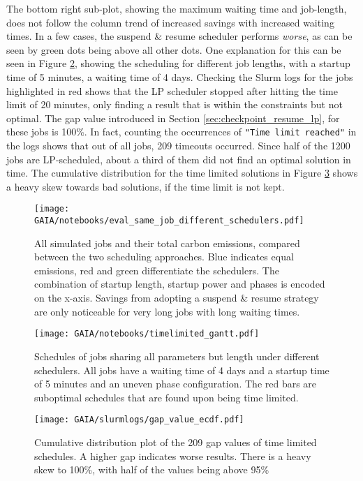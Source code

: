 The bottom right sub-plot, showing the maximum waiting time and job-length, does not follow the column trend of increased savings with increased waiting times. In a few cases, the suspend \& resume scheduler performs \emph{worse}, as can be seen by green dots being above all other dots.
One explanation for this can be seen in Figure \ref{fig:timelimited_gantt}, showing the scheduling for different job lengths, with a startup time of 5 minutes, a waiting time of 4 days.
Checking the Slurm logs for the jobs highlighted in red shows that the LP scheduler stopped after hitting the time limit of 20 minutes, only finding a result that is within the constraints but not optimal.
The gap value introduced in Section \ref{sec:checkpoint_resume_lp}, for these jobs is 100\%.
In fact, counting the occurrences of \verb|"Time limit reached"| in the logs shows that out of all jobs, 209 timeouts occurred. 
Since half of the 1200 jobs are LP-scheduled, about a third of them did not find an optimal solution in time.
The cumulative distribution for the time limited solutions in Figure \ref{fig:ecdf_gap} shows a heavy skew towards bad solutions, if the time limit is not kept.

\begin{figure}
    \texttt{[image: GAIA/notebooks/eval\_same\_job\_different\_schedulers.pdf]}
    \caption[short]{All simulated jobs and their total carbon emissions, compared between the two scheduling approaches. Blue indicates equal emissions, red and green differentiate the schedulers. The combination of startup length, startup power and phases is encoded on the x-axis. Savings from adopting a suspend \& resume strategy are only noticeable for very long jobs with long waiting times.}
    \label{fig:eval_different_schedulers}
\end{figure}

\begin{figure}
    \texttt{[image: GAIA/notebooks/timelimited\_gantt.pdf]}
    \caption[short]{Schedules of jobs sharing all parameters but length under different schedulers. All jobs have a waiting time of 4 days and a startup time of 5 minutes and an uneven phase configuration. The red bars are suboptimal schedules that are found upon being time limited.}
    \label{fig:timelimited_gantt}
\end{figure}

\begin{figure}
    \texttt{[image: GAIA/slurmlogs/gap\_value\_ecdf.pdf]}
    \caption[short]{Cumulative distribution plot of the 209 gap values of time limited schedules. A higher gap indicates worse results. There is a heavy skew to 100\%, with half of the values being above 95\%}
    \label{fig:ecdf_gap}
\end{figure}

